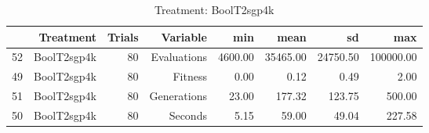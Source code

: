 \begin{table}[ht]
\centering
\begin{tabular}{rrrrrrrr}
  \hline
 & Treatment & Trials & Variable & min & mean & sd & max \\ 
  \hline
52 & BoolT2sgp4k &  80 & Evaluations & 4600.00 & 35465.00 & 24750.50 & 100000.00 \\ 
  49 & BoolT2sgp4k &  80 & Fitness & 0.00 & 0.12 & 0.49 & 2.00 \\ 
  51 & BoolT2sgp4k &  80 & Generations & 23.00 & 177.32 & 123.75 & 500.00 \\ 
  50 & BoolT2sgp4k &  80 & Seconds & 5.15 & 59.00 & 49.04 & 227.58 \\ 
   \hline
\end{tabular}
\caption{Treatment: BoolT2sgp4k} 
\end{table}
